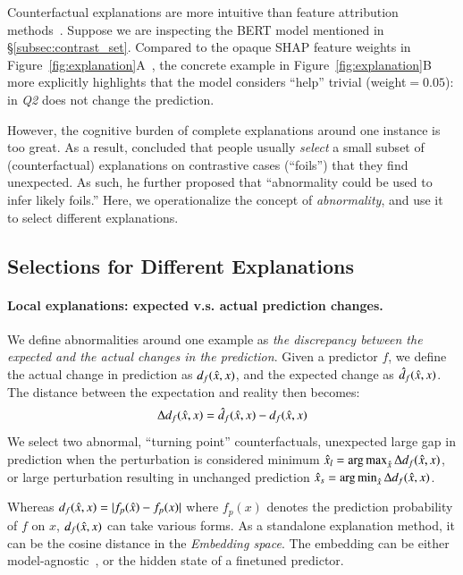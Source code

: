 Counterfactual explanations are more intuitive than feature attribution methods~\cite{miller}.
Suppose we are inspecting the \qqp BERT model mentioned in \S\ref{subsec:contrast_set}.
Compared to the opaque SHAP feature weights in Figure~\ref{fig:explanation}A~\cite{NIPS2017_7062}, the concrete example in Figure~\ref{fig:explanation}B more explicitly highlights that the model considers ``help'' trivial (weight$=0.05$): 
 in \emph{Q2} does not change the prediction.

However, the cognitive burden of complete explanations around one instance is too great.
As a result, \citet{miller} concluded that people usually \emph{select} a small subset of (counterfactual) explanations on contrastive cases (``foils'') that they find unexpected. 
As such, he further proposed that ``abnormality could be used to infer likely foils.''
Here, we operationalize the concept of \emph{abnormality}, and use it to select different explanations.


\subsection{Selections for Different Explanations}

\paragraph{Local explanations: expected v.s. actual prediction changes.}

We define abnormalities around one example as \emph{the discrepancy between the expected and the actual changes in the prediction}.
Given a predictor $f$, we define the actual change in prediction as $d_f(\hat{x}, x)$, and the expected change as $\hat{d}_f(\hat{x}, x)$.
The distance between the expectation and reality then becomes:
$$\Delta d_f(\hat{x}, x) = \hat{d}_f(\hat{x}, x)-d_f(\hat{x}, x)$$
We select two abnormal, ``turning point'' counterfactuals, \ie unexpected large gap in prediction when the perturbation is considered minimum $\hat{x}_l = \operatorname*{arg\,max}_{\hat{x}} \Delta d_f(\hat{x}, x)$, or large perturbation resulting in unchanged prediction $\hat{x}_s = \operatorname*{arg\,min}_{\hat{x}} \Delta d_f(\hat{x}, x)$.

Whereas $d_f(\hat{x}, x)=|f_p(\hat{x})-f_p(x)|$ where $f_p(x)$ denotes the prediction probability of $f$ on $x$, $d_f(\hat{x}, x)$ can take various forms. 
As a standalone explanation method, it can be the cosine distance in the \emph{Embedding space}.
The embedding can be either model-agnostic~\cite{reimers-2019-sentence-bert}, or the hidden state of a finetuned predictor.

